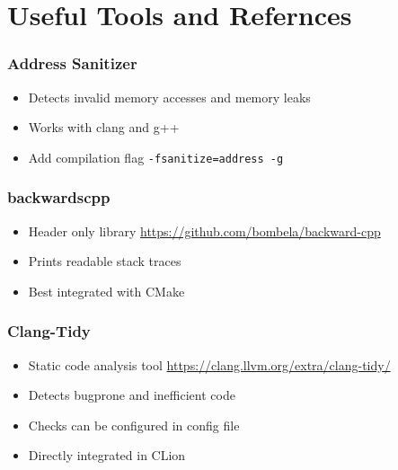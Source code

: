 \documentclass[usenames,dvipsnames,svgnames,table,aspectratio=169]{beamer}
\begin{document}
\section{Useful Tools and Refernces}
\begin{frame}
    \frametitle{Address Sanitizer}
    \begin{itemize}
        \item<+-> Detects invalid memory accesses and memory leaks
        \item<+-> Works with clang and g++
        \item<+-> Add compilation flag \lstinline{-fsanitize=address -g}
    \end{itemize}
\end{frame}

\begin{frame}
    \frametitle{backwardscpp}
    \begin{itemize}
        \item<+-> Header only library \url{https://github.com/bombela/backward-cpp}
        \item<+-> Prints readable stack traces
        \item<+-> Best integrated with CMake
    \end{itemize}
\end{frame}

\begin{frame}
    \frametitle{Clang-Tidy}
    \begin{itemize}
        \item<+-> Static code analysis tool \url{https://clang.llvm.org/extra/clang-tidy/}
        \item<+-> Detects bugprone and inefficient code
        \item<+-> Checks can be configured in config file
        \item<+-> Directly integrated in CLion
    \end{itemize}
\end{frame}
\end{document}
